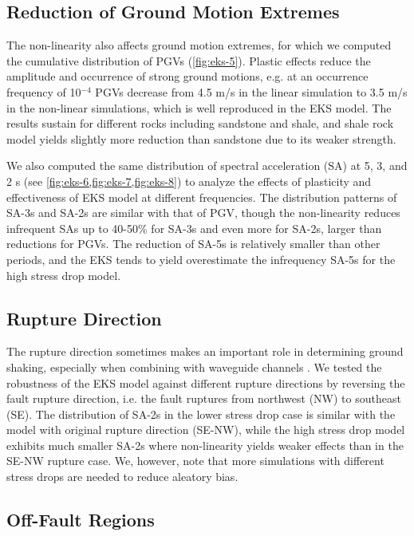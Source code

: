 \subsection{Reduction of Ground Motion Extremes}
The non-linearity also affects ground motion extremes, for which we computed the cumulative distribution of PGVs (\cref{fig:eks-5}). Plastic effects reduce the amplitude and occurrence of strong ground motions, e.g. at an occurrence frequency of 10$^{-4}$ PGVs decrease from 4.5 m/s in the linear simulation to 3.5 m/s in the non-linear simulations, which is well reproduced in the EKS model. The results sustain for different rocks including sandstone and shale, and shale rock model yields slightly more reduction than sandstone due to its weaker strength.

We also computed the same distribution of spectral acceleration (SA) at 5, 3, and 2 s (see \cref{fig:eks-6,fig:eks-7,fig:eks-8}) to analyze the effects of plasticity and effectiveness of EKS model at different frequencies. The distribution patterns of SA-3s and SA-2s are similar with that of PGV, though the non-linearity reduces infrequent SAs up to 40-50\% for SA-3s and even more for SA-2s, larger than reductions for PGVs. The reduction of SA-5s is relatively smaller than other periods, and the EKS tends to yield overestimate the infrequency SA-5s for the high stress drop model.

\subsection{Rupture Direction}
The rupture direction sometimes makes an important role in determining ground shaking, especially when combining with waveguide channels . We tested the robustness of the EKS model against different rupture directions by reversing the fault rupture direction, i.e. the fault ruptures from northwest (NW) to southeast (SE). The distribution of SA-2s in the lower stress drop case is similar with the model with original rupture direction (SE-NW), while the high stress drop model exhibits much smaller SA-2s where non-linearity yields weaker effects than in the SE-NW rupture case. We, however, note that more simulations with different stress drops are needed to reduce aleatory bias.

\subsection{Off-Fault Regions}

